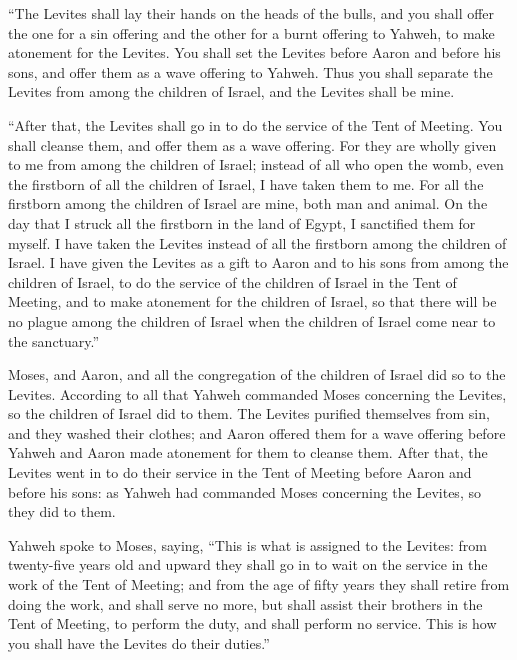  ``The Levites shall lay their hands on the heads of the
bulls, and you shall offer the one for a sin offering and the other for
a burnt offering to Yahweh, to make atonement for the Levites.
 You shall set the Levites before Aaron and before his
sons, and offer them as a wave offering to Yahweh.  Thus
you shall separate the Levites from among the children of Israel, and
the Levites shall be mine.

 ``After that, the Levites shall go in to do the service
of the Tent of Meeting. You shall cleanse them, and offer them as a wave
offering.  For they are wholly given to me from among the
children of Israel; instead of all who open the womb, even the firstborn
of all the children of Israel, I have taken them to me. 
For all the firstborn among the children of Israel are mine, both man
and animal. On the day that I struck all the firstborn in the land of
Egypt, I sanctified them for myself.  I have taken the
Levites instead of all the firstborn among the children of Israel.
 I have given the Levites as a gift to Aaron and to his
sons from among the children of Israel, to do the service of the
children of Israel in the Tent of Meeting, and to make atonement for the
children of Israel, so that there will be no plague among the children
of Israel when the children of Israel come near to the sanctuary.''

 Moses, and Aaron, and all the congregation of the
children of Israel did so to the Levites. According to all that Yahweh
commanded Moses concerning the Levites, so the children of Israel did to
them.  The Levites purified themselves from sin, and they
washed their clothes; and Aaron offered them for a wave offering before
Yahweh and Aaron made atonement for them to cleanse them.
 After that, the Levites went in to do their service in
the Tent of Meeting before Aaron and before his sons: as Yahweh had
commanded Moses concerning the Levites, so they did to them.

 Yahweh spoke to Moses, saying,  ``This is
what is assigned to the Levites: from twenty-five years old and upward
they shall go in to wait on the service in the work of the Tent of
Meeting;  and from the age of fifty years they shall
retire from doing the work, and shall serve no more,  but
shall assist their brothers in the Tent of Meeting, to perform the duty,
and shall perform no service. This is how you shall have the Levites do
their duties.''

